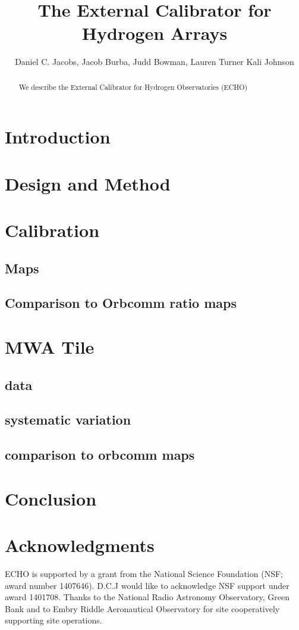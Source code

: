 \documentclass[preprint2,numberedappendix,tighten,twocolappendix]{aastex6}
\begin{document}
\title{The External Calibrator for Hydrogen Arrays}
\author{
Daniel C. Jacobs,
Jacob Burba,
Judd Bowman,
Lauren Turner
Kali Johnson}



\begin{abstract}
We describe the External Calibrator for Hydrogen Observatories (ECHO) 
\end{abstract}



\section{Introduction}\label{sec:intro}

\section{Design and Method}
\section{Calibration}
\subsection{Maps}
\subsection{Comparison to Orbcomm ratio maps}
\section{MWA Tile}
\subsection{data}
\subsection{systematic variation}
\subsection{comparison to orbcomm maps}
\section{Conclusion}


\section{Acknowledgments}{

ECHO is supported by a grant from the National Science Foundation (NSF; award number 1407646). D.C.J would like to acknowledge NSF support  under award 1401708.
Thanks to the National Radio Astronomy Observatory, Green Bank and to Embry Riddle Aeronautical Observatory for site cooperatively supporting site operations.
}


\end{document}
